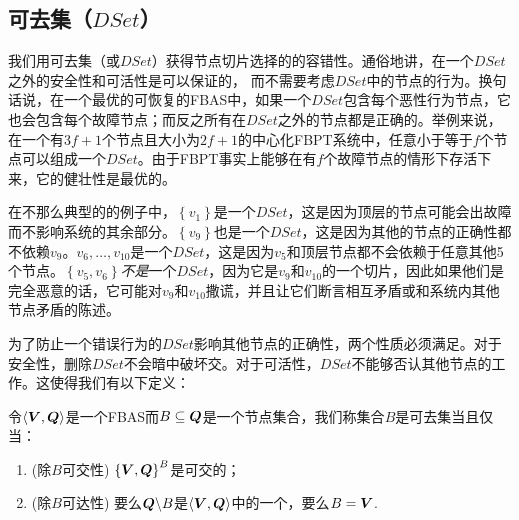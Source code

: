 \subsection{可去集（$DSet$）}
我们用可去集（或$DSet$）获得节点切片选择的的容错性。通俗地讲，在一个$DSet$之外的安全性和可活性是可以保证的，	而不需要考虑$DSet$中的节点的行为。换句话说，在一个最优的可恢复的FBAS中，如果一个$DSet$包含每个恶性行为节点，它也会包含每个故障节点；而反之所有在$DSet$之外的节点都是正确的。举例来说，在一个有$3f+1$个节点且{\quorum}大小为$2f+1$的中心化FBPT系统中，任意小于等于$f$个节点可以组成一个$DSet$。由于FBPT事实上能够在有$f$个故障节点的情形下存活下来，它的健壮性是最优的。

在不那么典型的的例子中，$\left\{v_1\right\}$是一个$DSet$，这是因为顶层的节点可能会出故障而不影响系统的其余部分。$\left\{v_9\right\}$也是一个$DSet$，这是因为其他的节点的正确性都不依赖$v_9$。$v_6,\ldots,v_10$是一个$DSet$，这是因为$v_5$和顶层节点都不会依赖于任意其他5个节点。$\left\{v_5,v_6\right\}$\textit{不是}一个$DSet$，因为它是$v_9$和$v_10$的一个切片，因此如果他们是完全恶意的话，它可能对$v_9$和$v_10$撒谎，并且让它们断言相互矛盾或和系统内其他节点矛盾的陈述。

为了防止一个错误行为的$DSet$影响其他节点的正确性，两个性质必须满足。对于安全性，删除$DSet$不会暗中破坏{\quorum}交。对于可活性，$DSet$不能够否认其他节点的工作{\quorum}。这使得我们有以下定义：

\begin{definition}[DSet]
	令$\langle{\bm V},{\bm Q}\rangle$是一个FBAS而$B\subseteq {\bm Q}$是一个节点集合，我们称集合$B$是可去集当且仅当：
	\begin{enumerate}
		\item (除$B${\quorum}可交性) $\left\{{\bm V},{\bm Q}\right\}^{B}$是{\quorum}可交的；
		\item (除$B${\quorum}可达性) 要么${\bm Q}\backslash B$是$\langle{\bm V},{\bm Q}\rangle$中的一个{\quorum}，要么$B={\bm V}$.
	\end{enumerate}
\end{definition}